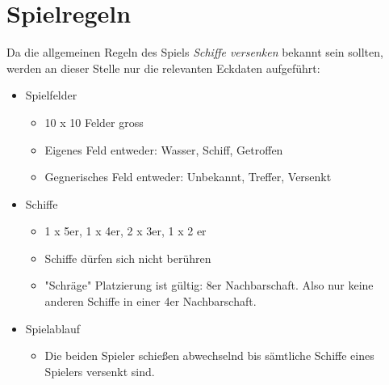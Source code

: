 \section{Spielregeln}
\label{sec:Spielregeln}

Da die allgemeinen Regeln des Spiels \textit{Schiffe versenken} bekannt sein sollten, werden an dieser Stelle nur die relevanten Eckdaten aufgeführt:


\begin{itemize}
	\item Spielfelder
		\begin{itemize}
			\item 10 x 10 Felder gross
			\item Eigenes Feld entweder: Wasser, Schiff, Getroffen
			\item Gegnerisches Feld entweder: Unbekannt, Treffer, Versenkt
		\end{itemize}
	\item Schiffe
		\begin{itemize}
			\item 1 x 5er, 1 x 4er, 2 x 3er, 1 x 2 er
			\item Schiffe dürfen sich nicht berühren
			\item "Schräge" Platzierung ist gültig: 8er Nachbarschaft. Also nur keine anderen Schiffe in einer 4er Nachbarschaft. 
		\end{itemize}
	\item Spielablauf
		\begin{itemize}
			\item Die beiden Spieler schießen abwechselnd bis sämtliche Schiffe eines Spielers versenkt sind.
		\end{itemize}
	
\end{itemize}